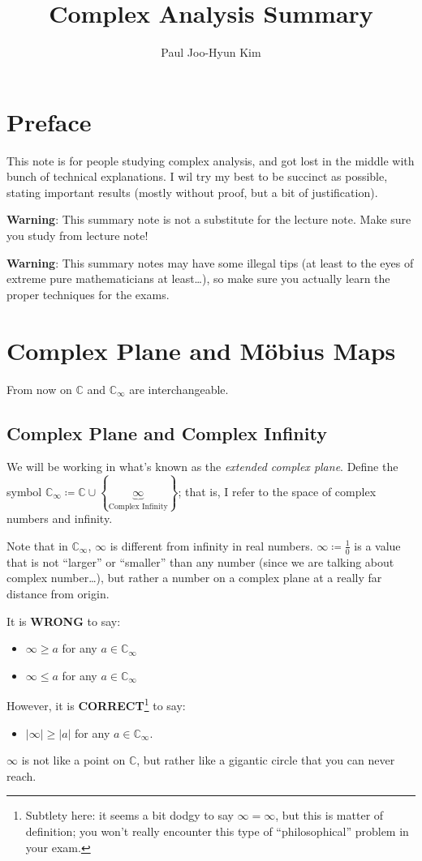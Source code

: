 \documentclass[a4paper, 12pt]{article}
\title{Complex Analysis Summary}
\author{Paul Joo-Hyun Kim}
\theoremstyle{definition}
\numberwithin{theorem}{section}
\numberwithin{definition}{section}
\numberwithin{exercise}{section}
\numberwithin{remark}{section}
\numberwithin{figure}{section}
\numberwithin{example}{section}
\newcommand{\C}{\mathbb{C}}
\begin{document}
\maketitle
\tableofcontents
\setcounter{section}{-1}
\section{Preface}
This note is for people studying complex analysis,
and got lost in the middle with bunch of technical explanations.
I wil try my best to be succinct as possible,
stating important results (mostly without proof, but a bit of justification).

\textbf{Warning}: This summary note is not a substitute for the lecture note.
Make sure you study from lecture note!

\textbf{Warning}: This summary notes may have some illegal tips (at least to the eyes of extreme pure mathematicians at least\dots),
so make sure you actually learn the proper techniques for the exams.

\section{Complex Plane and M\"obius Maps}
From now on $\C$ and $\C_{\infty}$ are interchangeable.
\subsection{Complex Plane and Complex Infinity}
We will be working in what's known as the \textit{extended complex plane}.
Define the symbol $\C_{\infty} \coloneqq \C \cup \left\{ \underbrace{\infty}_{\text{Complex Infinity}} \right\}$;
that is, I refer to the space of complex numbers
and infinity.

Note that in $\C_{\infty}$, $\infty$ is different from infinity in real numbers.
$\infty \coloneqq \frac{1}{0}$ is a value that is not ``larger'' or ``smaller'' than any number
(since we are talking about complex number\dots), but rather
a number on a complex plane at a really far distance from origin.

It is \textbf{WRONG} to say:
\begin{itemize}
    \item $\infty \geq a$ for any $a \in \C_{\infty}$
    \item $\infty \leq a$ for any $a \in \C_{\infty}$
\end{itemize}
However, it is \textbf{CORRECT}\footnote{
    Subtlety here: it seems a bit dodgy to say $\infty = \infty$,
    but this is matter of definition;
    you won't really encounter this type of ``philosophical'' problem
    in your exam.
} to say:
\begin{itemize}
    \item $|\infty| \geq |a|$ for any $a \in \C_{\infty}$.
\end{itemize}
$\infty$ is not like a point on $\C$, but rather like a gigantic circle that you can never reach.
\end{document}
